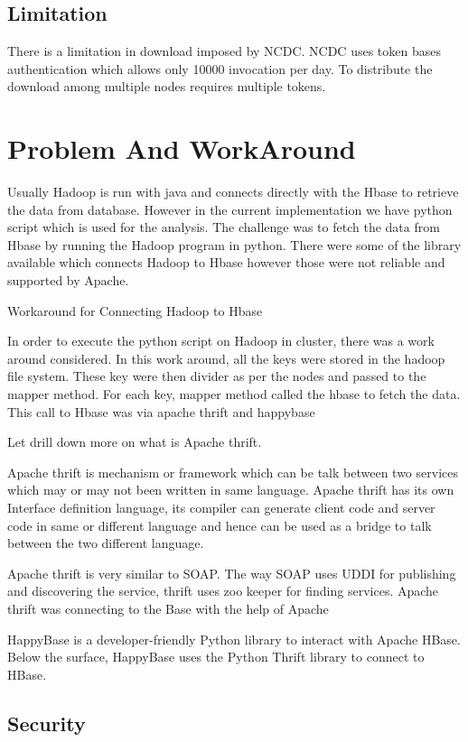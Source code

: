\documentclass[9pt,twocolumn,twoside]{../../styles/osajnl}
\begin{document}
\subsection{Limitation}
There is a limitation in download imposed by NCDC. NCDC uses token bases authentication which allows only 10000 invocation per day. To distribute the download among multiple nodes requires multiple tokens.

\section{Problem And WorkAround}

Usually Hadoop is run with java and connects directly with the Hbase to retrieve the data from database.
However in the current implementation we have python script which is used for the analysis. The challenge was to fetch the data from Hbase by running the Hadoop program in python. 
There were some of the library available which connects Hadoop to Hbase  however those were not reliable and supported by Apache. 

Workaround for Connecting Hadoop to Hbase

In order to execute the python script on Hadoop in cluster, there was a work around considered. 
In this work around, all the keys were stored in the hadoop file system. These key were then divider as per the nodes and passed to the mapper method. 
For each key, mapper method called the hbase to fetch the data.  This call to Hbase was via apache thrift and happybase

Let drill down more on what is Apache thrift. 

Apache thrift is mechanism or framework which can be talk between two services which may or may not been written in same language. Apache thrift has its own 
Interface definition language, its compiler can generate client code and server code in same or different language and hence can be used as a bridge to talk between the two different language.

Apache thrift is very similar to SOAP. The way SOAP uses UDDI for publishing and discovering the service, thrift uses zoo keeper for finding services.
Apache thrift was connecting to the Base with the help of Apache 


HappyBase is a developer-friendly Python library to interact with Apache HBase. 
Below the surface, HappyBase uses the Python Thrift library to connect to HBase.  

\subsection{Security}  
\end{document}

